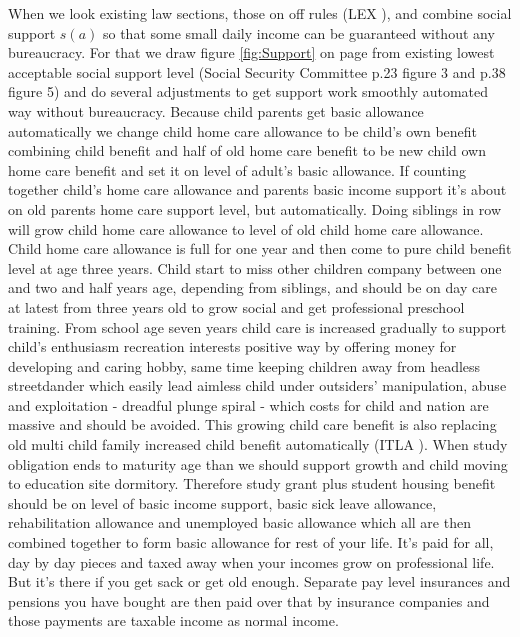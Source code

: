 When we look existing law sections, those on off rules (LEX \cite{LEX_2012_916en}),
and combine social support $s(a)$ so that some small daily income can be guaranteed without any bureaucracy.
For that we draw figure \ref{fig:Support} on page \pageref{fig:Support} from existing lowest acceptable social support level
(Social Security Committee \cite{VN_2023_26} p.23 figure 3 and p.38 figure 5)
and do several adjustments to get support work smoothly automated way without bureaucracy.
Because child parents get basic allowance automatically we change child home care allowance to be child's own benefit
combining child benefit and half of old home care benefit to be new child own home care benefit and set it on level of adult's basic allowance.
If counting together child's home care allowance and parents basic income support it's about on old parents home care support level, but automatically.
Doing siblings in row will grow child home care allowance to level of old child home care allowance.
Child home care allowance is full for one year and then come to pure child benefit level at age three years.
Child start to miss other children company between one and two and half years age, depending from siblings,
and should be on day care at latest from three years old to grow social and get professional preschool training.
From school age seven years child care is increased gradually to support child's enthusiasm recreation interests positive way by offering money for developing and caring hobby,
same time keeping children away from headless streetdander which easily lead aimless child under
outsiders' manipulation, abuse and exploitation - dreadful plunge spiral - which costs for child
and nation are massive and should be avoided.
This growing child care benefit is also replacing old multi child family increased child benefit automatically (ITLA \cite{ITLA_2023_LL}).
When study obligation ends to maturity age than we should support growth and child moving to education site dormitory.
Therefore study grant plus student housing benefit should be on level of basic income support,
basic sick leave allowance, rehabilitation allowance and unemployed basic allowance
which all are then combined together to form basic allowance for rest of your life.
It's paid for all, day by day pieces and taxed away when your incomes grow on professional life.
But it's there if you get sack or get old enough.
Separate pay level insurances and pensions you have bought are then paid over that by insurance companies
and those payments are taxable income as normal income.

